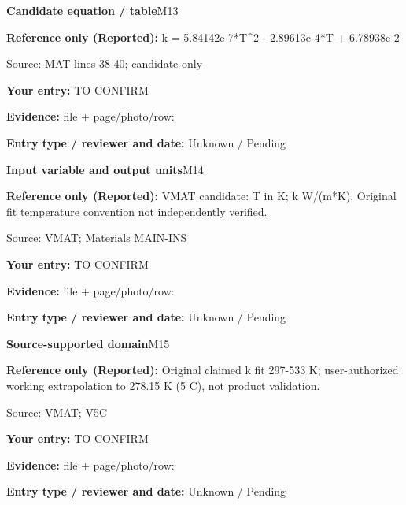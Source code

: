 \documentclass[11pt]{article}
\begin{document}
\par\noindent\begin{minipage}{\textwidth}\small
{\color{navy}\bfseries Candidate equation / table}\hfill M13\par
\colorbox{pale}{\parbox{\dimexpr\linewidth-2\fboxsep\relax}{
\textbf{Reference only (Reported):} k = 5.84142e-7*T\textasciicircum{}2 - 2.89613e-4*T + 6.78938e-2\par
{\footnotesize Source: MAT lines 38-40; candidate only}}}\par
\textbf{Your entry:} {\color{muted}TO CONFIRM}\enspace\hrulefill\par
{\footnotesize\textbf{Evidence:} file + page/photo/row: \hrulefill\par
\textbf{Entry type / reviewer and date:} Unknown / Pending\par
}\end{minipage}\par\vspace{5pt}
\par\noindent\begin{minipage}{\textwidth}\small
{\color{navy}\bfseries Input variable and output units}\hfill M14\par
\colorbox{pale}{\parbox{\dimexpr\linewidth-2\fboxsep\relax}{
\textbf{Reference only (Reported):} VMAT candidate: T in K; k W/(m*K). Original fit temperature convention not independently verified.\par
{\footnotesize Source: VMAT; Materials MAIN-INS}}}\par
\textbf{Your entry:} {\color{muted}TO CONFIRM}\enspace\hrulefill\par
{\footnotesize\textbf{Evidence:} file + page/photo/row: \hrulefill\par
\textbf{Entry type / reviewer and date:} Unknown / Pending\par
}\end{minipage}\par\vspace{5pt}
\par\noindent\begin{minipage}{\textwidth}\small
{\color{navy}\bfseries Source-supported domain}\hfill M15\par
\colorbox{pale}{\parbox{\dimexpr\linewidth-2\fboxsep\relax}{
\textbf{Reference only (Reported):} Original claimed k fit 297-533 K; user-authorized working extrapolation to 278.15 K (5 C), not product validation.\par
{\footnotesize Source: VMAT; V5C}}}\par
\textbf{Your entry:} {\color{muted}TO CONFIRM}\enspace\hrulefill\par
{\footnotesize\textbf{Evidence:} file + page/photo/row: \hrulefill\par
\textbf{Entry type / reviewer and date:} Unknown / Pending\par
}\end{minipage}\par\vspace{5pt}
\end{document}
